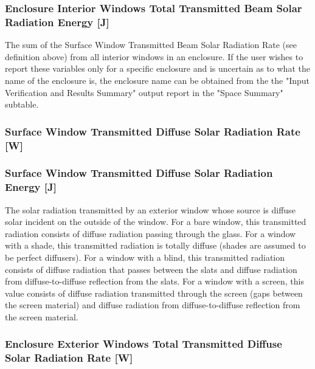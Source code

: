 \subsubsection{Enclosure Interior Windows Total Transmitted Beam Solar Radiation Energy {[}J{]}}\label{zone-interior-windows-total-transmitted-beam-solar-radiation-energy-j}

The sum of the Surface Window Transmitted Beam Solar Radiation Rate (see definition above) from all interior windows in an enclosure. If the user wishes to report these variables only for a specific enclosure and is uncertain as to what the name of the enclosure is, the enclosure name can be obtained from the the "Input Verification and Results Summary" output report in the "Space Summary" subtable.

\subsubsection{Surface Window Transmitted Diffuse Solar Radiation Rate {[}W{]}}\label{surface-window-transmitted-diffuse-solar-radiation-rate-w}

\subsubsection{Surface Window Transmitted Diffuse Solar Radiation Energy {[}J{]}}\label{surface-window-transmitted-diffuse-solar-radiation-energy-j}

The solar radiation transmitted by an exterior window whose source is diffuse solar incident on the outside of the window. For a bare window, this transmitted radiation consists of diffuse radiation passing through the glass. For a window with a shade, this transmitted radiation is totally diffuse (shades are assumed to be perfect diffusers). For a window with a blind, this transmitted radiation consists of diffuse radiation that passes between the slats and diffuse radiation from diffuse-to-diffuse reflection from the slats. For a window with a screen, this value consists of diffuse radiation transmitted through the screen (gaps between the screen material) and diffuse radiation from diffuse-to-diffuse reflection from the screen material.

\subsubsection{Enclosure Exterior Windows Total Transmitted Diffuse Solar Radiation Rate {[}W{]}}\label{zone-exterior-windows-total-transmitted-diffuse-solar-radiation-rate-w}

